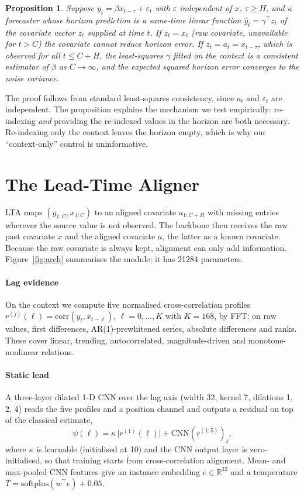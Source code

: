 \documentclass[preprint,11pt,authoryear]{elsarticle}
\newtheorem{proposition}{Proposition}
\newcommand{\lta}{\textsc{LTA}}
\begin{document}
\begin{proposition}\label{prop:same-time}
Suppose $y_t = \beta x_{t-\tau} + \varepsilon_t$ with $\varepsilon$ independent of $x$, $\tau\ge H$, and a forecaster whose horizon prediction is a same-time linear function $\hat y_t = \gamma^\top z_t$ of the covariate vector $z_t$ supplied at time $t$. If $z_t = x_t$ (raw covariate, unavailable for $t>C$) the covariate cannot reduce horizon error. If $z_t = a_t = x_{t-\tau}$, which is observed for all $t\le C+H$, the least-squares $\gamma$ fitted on the context is a consistent estimator of $\beta$ as $C\to\infty$, and the expected squared horizon error converges to the noise variance.
\end{proposition}
The proof follows from standard least-squares consistency, since $a_t$ and $\varepsilon_t$ are independent. The proposition explains the mechanism we test empirically: re-indexing \emph{and} providing the re-indexed values in the horizon are both necessary. Re-indexing only the context leaves the horizon empty, which is why our ``context-only'' control is uninformative.

\section{The Lead-Time Aligner}
\label{sec:method}

\lta{} maps $(y_{1:C}, x_{1:C})$ to an aligned covariate $a_{1:C+H}$ with missing entries wherever the source value is not observed. The backbone then receives the raw past covariate $x$ and the aligned covariate $a$, the latter as a known covariate. Because the raw covariate is always kept, alignment can only add information. Figure~\ref{fig:arch} summarises the module; it has \num{21284} parameters.

\paragraph{Lag evidence} On the context we compute five normalised cross-correlation profiles $r^{(j)}(\ell)=\mathrm{corr}(y_t, x_{t-\ell})$, $\ell=0,\dots,K$ with $K=168$, by FFT: on raw values, first differences, AR(1)-prewhitened series, absolute differences and ranks. These cover linear, trending, autocorrelated, magnitude-driven and monotone-nonlinear relations.

\paragraph{Static lead} A three-layer dilated 1-D CNN over the lag axis (width 32, kernel 7, dilations 1, 2, 4) reads the five profiles and a position channel and outputs a residual on top of the classical estimate,
\begin{equation}
\psi(\ell) = \kappa\,\bigl|r^{(1)}(\ell)\bigr| + \mathrm{CNN}(r^{(1:5)})_\ell,
\end{equation}
where $\kappa$ is learnable (initialised at 10) and the CNN output layer is zero-initialised, so that training starts from cross-correlation alignment. Mean- and max-pooled CNN features give an instance embedding $e\in\mathbb{R}^{32}$ and a temperature $T=\mathrm{softplus}(w^\top e)+0.05$.
\end{document}
